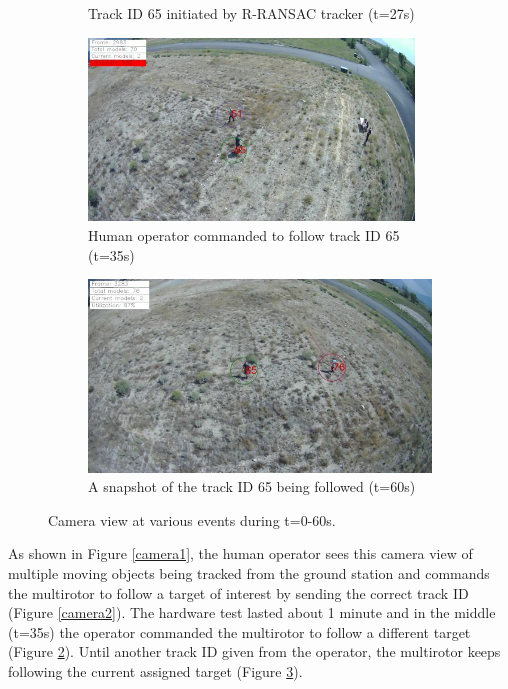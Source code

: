 \begin{figure}[htbp]
\begin{subfigure}{0.48\linewidth}
		\caption{Track ID 65 initiated by R-RANSAC tracker (t=27s)}
		\label{camera3}
	\end{subfigure}
	\begin{subfigure}{0.48\linewidth}
		\centering
		\includegraphics[width=0.95\textwidth]{images/chapter3/ID65_follow_begin.png}
		\caption{Human operator commanded to follow track ID 65 (t=35s)}
		\label{camera4}
	\end{subfigure}
	\centering
	\begin{subfigure}{0.48\linewidth}
		\centering
		\includegraphics[width=\textwidth]{images/chapter3/ID65_following.png}
		\caption{A snapshot of the track ID 65 being followed (t=60s)}
		\label{camera5}
	\end{subfigure}
	\caption{Camera view at various events during t=0-60s.}
	\label{camera}
\end{figure}
As shown in Figure \ref{camera1}, the human operator sees this camera view of multiple moving objects being tracked from the ground station and commands the multirotor to follow a target of interest by sending the correct track ID (Figure \ref{camera2}). The hardware test lasted about 1 minute and in the middle (t=35s) the operator commanded the multirotor to follow a different target (Figure \ref{camera4}). Until another track ID given from the operator, the multirotor keeps following the current assigned target (Figure \ref{camera5}).


